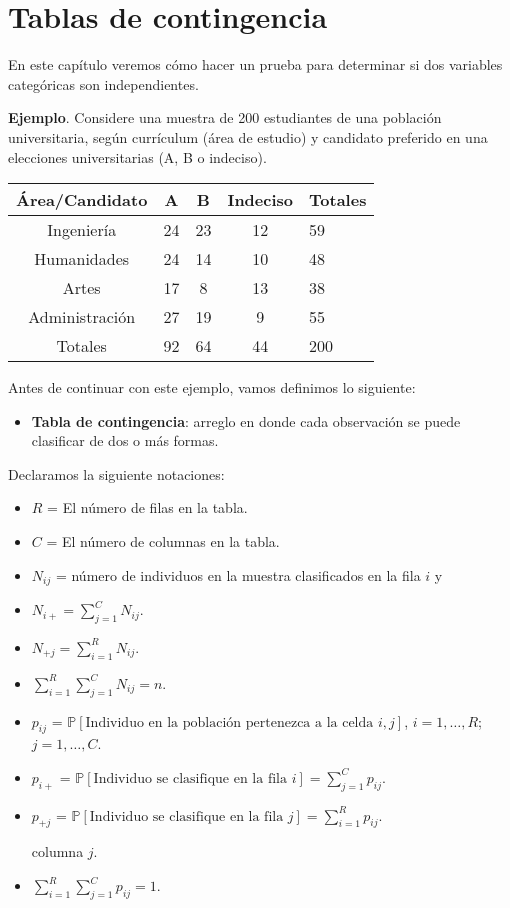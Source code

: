 \documentclass[
  12pt,
]{book}
\providecommand{\tightlist}{%
  \setlength{\itemsep}{0pt}\setlength{\parskip}{0pt}}
\begin{document}
\hypertarget{tablas-de-contingencia}{%
\chapter{Tablas de contingencia}\label{tablas-de-contingencia}}

En este capítulo veremos cómo hacer un prueba para determinar si dos variables
categóricas son independientes.

\textbf{Ejemplo}. Considere una muestra de 200 estudiantes de una población
universitaria, según currículum (área de estudio) y candidato preferido en una
elecciones universitarias (A, B o indeciso).

\begin{longtable}[]{@{}ccccl@{}}
\toprule
Área/Candidato & A & B & Indeciso & \textbar{} Totales\tabularnewline
\midrule
\endhead
Ingeniería & 24 & 23 & 12 & \textbar{} 59\tabularnewline
Humanidades & 24 & 14 & 10 & \textbar{} 48\tabularnewline
Artes & 17 & 8 & 13 & \textbar{} 38\tabularnewline
Administración & 27 & 19 & 9 & \textbar{} 55\tabularnewline
Totales & 92 & 64 & 44 & \textbar{} 200\tabularnewline
\bottomrule
\end{longtable}

Antes de continuar con este ejemplo, vamos definimos lo siguiente:

\begin{itemize}
\tightlist
\item
  \textbf{Tabla de contingencia}: arreglo en donde cada observación se puede clasificar
  de dos o más formas.
\end{itemize}

Declaramos la siguiente notaciones:

\begin{itemize}
\item
  \(R\) = El número de filas en la tabla.\\
\item
  \(C\) = El número de columnas en la tabla.
\item
  \(N_{ij}\) = número de individuos en la muestra clasificados en la fila \(i\) y
\item
  \(\displaystyle N_{i+} = \sum_{j=1}^CN_{ij}\).
\item
  \(\displaystyle N_{+j} = \sum_{i=1}^RN_{ij}\).
\item
  \(\displaystyle \sum_{i=1}^R\sum_{j=1}^C N_{ij} = n\).
\item
  \(p_{ij}\) =
  \(\displaystyle\mathbb P[\text{Individuo en la población pertenezca a la celda }i,j]\),
  \(i=1,\dots,R\); \(j=1,\dots, C\).
\item
  \(p_{i+}\) =
  \(\displaystyle\mathbb P[\text{Individuo se clasifique en la fila }i] = \sum_{j=1}^C p_{ij}\).
\item
  \(p_{+j}\) = \(\displaystyle\mathbb P[\text{Individuo se clasifique en la fila }j] = \sum_{i=1}^R p_{ij}\).

  columna \(j\).
\item
  \(\displaystyle \sum_{i=1}^R\sum_{j=1}^Cp_{ij} = 1\).
\end{itemize}
\end{document}
